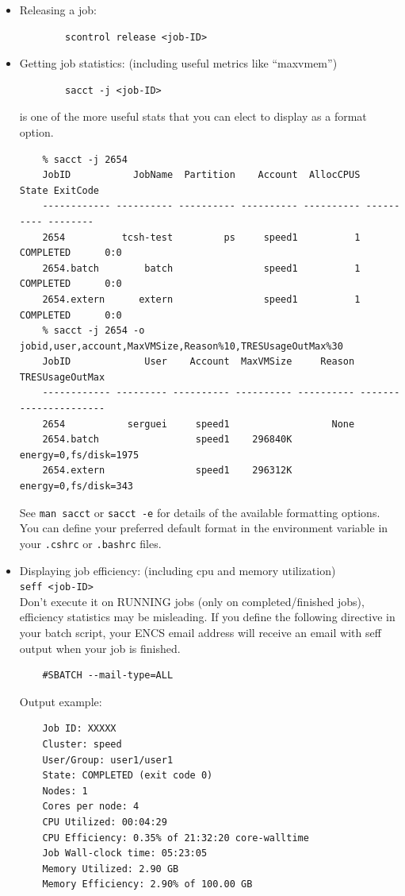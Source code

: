 \begin{itemize}
	\item Releasing a job:
	\begin{verbatim}
		scontrol release <job-ID>
	\end{verbatim}

	\item Getting job statistics: (including useful metrics like ``maxvmem'')
	\begin{verbatim}
		sacct -j <job-ID>
	\end{verbatim}
	
	 is one of the more useful stats that you can elect to display
	as a format option.
	\small
	\begin{verbatim}
	% sacct -j 2654
	JobID           JobName  Partition    Account  AllocCPUS      State ExitCode
	------------ ---------- ---------- ---------- ---------- ---------- --------
	2654          tcsh-test         ps     speed1          1  COMPLETED      0:0
	2654.batch        batch                speed1          1  COMPLETED      0:0
	2654.extern      extern                speed1          1  COMPLETED      0:0
	% sacct -j 2654 -o jobid,user,account,MaxVMSize,Reason%10,TRESUsageOutMax%30
	JobID             User    Account  MaxVMSize     Reason        TRESUsageOutMax
	------------ --------- ---------- ---------- ---------- ----------------------
	2654           serguei     speed1                  None
	2654.batch                 speed1    296840K             energy=0,fs/disk=1975
	2654.extern                speed1    296312K              energy=0,fs/disk=343
	\end{verbatim}
	\normalsize
	See \texttt{man sacct} or \texttt{sacct -e} for details of the available formatting options. 
	You can define your preferred default format in the  environment variable
	in your \texttt{.cshrc} or \texttt{.bashrc} files.

	\item Displaying job efficiency: (including cpu and memory utilization)\\
	\texttt{seff <job-ID>}\\
	Don't execute it on RUNNING jobs (only on completed/finished jobs), efficiency statistics may be misleading.
	If you define the following directive in your batch script, your ENCS email address will receive an email with seff output when your job is finished.
	\begin{verbatim}
	#SBATCH --mail-type=ALL        
	\end{verbatim}

	Output example:
	\small
	\begin{verbatim}
	Job ID: XXXXX
	Cluster: speed
	User/Group: user1/user1
	State: COMPLETED (exit code 0)
	Nodes: 1
	Cores per node: 4
	CPU Utilized: 00:04:29
	CPU Efficiency: 0.35% of 21:32:20 core-walltime
	Job Wall-clock time: 05:23:05
	Memory Utilized: 2.90 GB
	Memory Efficiency: 2.90% of 100.00 GB
	\end{verbatim}
	\normalsize
\end{itemize}


